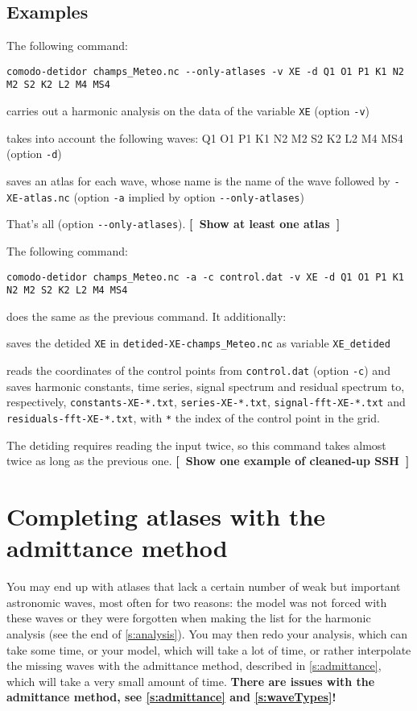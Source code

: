 \documentclass[11pt]{article} %
\providecommand{\code}[1]{\hbox{\lstinline|#1|}}
\newenvironment{itemize*}%
{\begin{itemize}%
  \setlength{\itemsep}{0pt}%
  \setlength{\topsep}{0pt}%
  \setlength{\partopsep}{0pt}%
  }%
{\end{itemize}}
\providecommand{\mynote}[1]{{\color[rgb]{1,.4,0}\sffamily\bfseries[~#1~]}}%
\providecommand{\mynote}[1]{}%
\providecommand{\admittanceWarning}{There are issues with the admittance method, see \ref{s:admittance} and \ref{s:waveTypes}!}
\begin{document}
\begin{multicols}{2}
\subsection{Examples}\label{s:comodo-detidor-examples}

The following command:
\begin{lstlisting}
comodo-detidor champs_Meteo.nc --only-atlases -v XE -d Q1 O1 P1 K1 N2 M2 S2 K2 L2 M4 MS4
\end{lstlisting}
\begin{itemize*}
\item carries out a harmonic analysis on the data of the variable \code{XE} (option \code{-v})
\item takes into account the following waves: Q1 O1 P1 K1 N2 M2 S2 K2 L2 M4 MS4 (option \code{-d})
\item saves an atlas for each wave, whose name is the name of the wave followed by \code{-XE-atlas.nc} (option \code{-a} implied by option \code{--only-atlases})
\end{itemize*}
That's all (option \code{--only-atlases}).
\mynote{Show at least one atlas}

The following command:
\begin{lstlisting}
comodo-detidor champs_Meteo.nc -a -c control.dat -v XE -d Q1 O1 P1 K1 N2 M2 S2 K2 L2 M4 MS4
\end{lstlisting}
does the same as the previous command. It additionally:
\begin{itemize*}
\item saves the detided \code{XE} in \code{detided-XE-champs_Meteo.nc} as variable \code{XE_detided}
\item reads the coordinates of the control points from \code{control.dat} (option \code{-c}) and saves harmonic constants, time series, signal spectrum and residual spectrum to, respectively, \code{constants-XE-*.txt}, \code{series-XE-*.txt}, \code{signal-fft-XE-*.txt} and \code{residuals-fft-XE-*.txt}, with \code{*} the index of the control point in the grid.
\end{itemize*}
The detiding requires reading the input twice, so this command takes almost twice as long as the previous one.
\mynote{Show one example of cleaned-up SSH}

\section{Completing atlases with the admittance method}

You may end up with atlases that lack a certain number of weak but important astronomic waves, most often for two reasons:
  the model was not forced with these waves
  or they were forgotten when making the list for the harmonic analysis (see the end of \ref{s:analysis}).
You may then redo your analysis, which can take some time, or your model, which will take a lot of time, or rather interpolate the missing waves with the admittance method, described in \ref{s:admittance}, which will take a very small amount of time.
{\bfseries \admittanceWarning}


\end{multicols}
\end{document}
